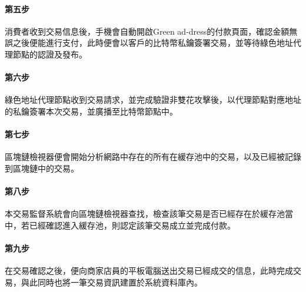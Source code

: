 	\paragraph{第五步}消費者收到交易信息後，手機會自動開啟Green ad-dress的付款頁面，確認金額無誤之後便能進行支付，此時便會以客戶的比特幣私鑰簽署交易，並等待綠色地址代理節點的認證及發布。
	\paragraph{第六步}綠色地址代理節點收到交易請求，並完成驗證非雙花攻擊後，以代理節點對應地址的私鑰簽署本次交易，並廣播至比特幣節點中。
	\paragraph{第七步}區塊鏈檢視器便會開始分析網路中存在的所有在緩存池中的交易，以及已經被記錄到區塊鏈中的交易。
	\paragraph{第八步}本交易監督系統會向區塊鏈檢視器查找，檢查該筆交易是否已經存在於緩存池當中，若已經確認進入緩存池，則認定該筆交易成立並完成付款。
	\paragraph{第九步}在交易確認之後，便向商家店員的平板電腦送出交易已經成交的信息，此時完成交易，與此同時也將一筆交易資訊建置於系統資料庫內。

